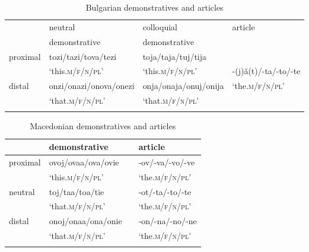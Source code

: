 \documentclass[output=paper,
colorlinks,
citecolor=brown,
newtxmath
]{langscibook}
\begin{document}
\begin{table}
\centering
\small
\setlength\tabcolsep{6pt}
 \begin{tabularx}{\textwidth}{llll}
  \lsptoprule
          & neutral  & colloquial  &  article \\
          & demonstrative & demonstrative & \\
  \midrule
  proximal  & tozi/tazi/tova/tezi &  toja/taja/tuj/tija  &  \\
    & `this.\textsc{m/f/n/pl}' & `this.\textsc{m/f/n/pl}' &-(j)ă(t)/-ta/-to/-te\\
  distal  &   onzi/onazi/onova/onezi & onja/onaja/onuj/onija & `the.\textsc{m/f/n/pl}'  \\
   & `that.\textsc{m/f/n/pl}' & `that.\textsc{m/f/n/pl}' & \\
  \lspbottomrule
 \end{tabularx}
 \caption{Bulgarian demonstratives and articles}
\label{tab:1}
\end{table}


\begin{table}
\centering
 \begin{tabularx}{\textwidth}{llll}
  \lsptoprule
          & demonstrative &  &  article \\
  \midrule
  proximal  & ovoj/ovaa/ova/ovie &   & -ov/-va/-vo/-ve \\
  & `this.\textsc{m/f/n/pl}' &  & `the.\textsc{m/f/n/pl}'\\
  neutral & toj/taa/toa/tie & &  -ot/-ta/-to/-te \\
 & `that.\textsc{m/f/n/pl}' & & `the.\textsc{m/f/n/pl}'\\
  distal  &   onoj/onaa/ona/onie &  & -on/-na/-no/-ne  \\
 & `that.\textsc{m/f/n/pl}' &  & `the.\textsc{m/f/n/pl}'\\
  \lspbottomrule
 \end{tabularx}
 \caption{Macedonian demonstratives and articles}
\label{tab:2}
\end{table}
\end{document}
